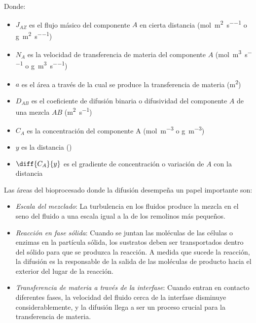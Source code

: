 \documentclass{AsignaturaResumen}
\begin{document}
Donde:

\begin{itemize}
    \item $J_{AZ}$ es el flujo másico del componente $A$ en cierta distancia (\unit{\mole\per\m\squared\per\s} o  \unit{\g\per\m\squared\per\s})
    \item $N_{A}$ es la velocidad de transferencia de materia del componente $A$ (\unit{\mole\per\m\cubed\per\s} o \unit{\g\per\m\cubed\per\s})
    \item $a$ es el área a través de la cual se produce la transferencia de materia (\unit{\m\squared})
    \item $D_{AB}$ es el coeficiente de difusión binaria o difusividad del componente $A$ de una mezcla $AB$ (\unit{\m\squared\per\s})
    \item $C_{A}$ es la concentración del componente A (\unit{\mole\per\m\cubed} o \unit{\g\per\m\cubed})
    \item $y$ es la distancia (\unit{})
    \item $\diff{C_{A}}{y}$ es el gradiente de concentración o variación de $A$ con la distancia
\end{itemize}


Las áreas del bioprocesado donde la difusión desempeña un papel importante son:

\begin{itemize}
    \item \emph{Escala del mezclado}: La turbulencia en los fluidos produce la mezcla en el seno del fluido a una escala igual a la de los remolinos más pequeños.
    \item \emph{Reacción en fase sólida}: Cuando se juntan las moléculas de las células o enzimas en la partícula sólida, los sustratos deben ser transportados dentro del sólido   para que se produzca la reacción. A medida que sucede la reacción, la difusión es la responsable de la salida de las moléculas de producto hacia el exterior del lugar de la reacción.
    \item \emph{Transferencia de materia a través de la interfase}: Cuando entran en contacto diferentes fases, la velocidad del fluido cerca de la interfase disminuye considerablemente, y la difusión llega a ser un proceso crucial para la transferencia de materia.
\end{itemize}
\end{document}
